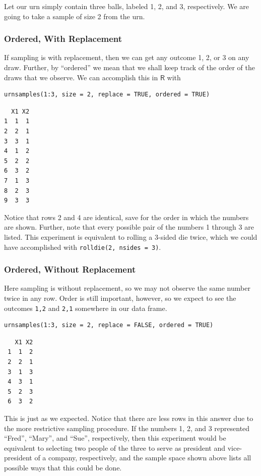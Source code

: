 \documentclass[captions=tableheading]{scrbook}
\begin{document}
\begin{example}
Let our urn simply contain three balls, labeled 1, 2, and 3, respectively. We are going to take a sample of size 2 from the urn. 
\subsubsection{Ordered, With Replacement}
\label{sec-4-1-2-2}


If sampling is with replacement, then we can get any outcome 1, 2, or 3 on any draw. Further, by ``ordered'' we mean that we shall keep track of the order of the draws that we observe. We can accomplish this in \(\mathsf{R}\) with


\begin{verbatim}
urnsamples(1:3, size = 2, replace = TRUE, ordered = TRUE)
\end{verbatim}


\begin{verbatim}
  X1 X2
1  1  1
2  2  1
3  3  1
4  1  2
5  2  2
6  3  2
7  1  3
8  2  3
9  3  3
\end{verbatim}

Notice that rows 2 and 4 are identical, save for the order in which the numbers are shown. Further, note that every possible pair of the numbers 1 through 3 are listed. This experiment is equivalent to rolling a 3-sided die twice, which we could have accomplished with \texttt{rolldie(2, nsides = 3)}.
\subsubsection{Ordered, Without Replacement}
\label{sec-4-1-2-3}


Here sampling is without replacement, so we may not observe the same number twice in any row. Order is still important, however, so we expect to see the outcomes \texttt{1,2} and \texttt{2,1} somewhere in our data frame. 


\begin{verbatim}
urnsamples(1:3, size = 2, replace = FALSE, ordered = TRUE)
\end{verbatim}

\begin{verbatim}
   X1 X2
 1  1  2
 2  2  1
 3  1  3
 4  3  1
 5  2  3
 6  3  2
\end{verbatim}

This is just as we expected. Notice that there are less rows in this answer due to the more restrictive sampling procedure. If the numbers 1, 2, and 3 represented ``Fred'', ``Mary'', and ``Sue'', respectively, then this experiment would be equivalent to selecting two people of the three to serve as president and vice-president of a company, respectively, and the sample space shown above lists all possible ways that this could be done.

\end{example}
\end{document}
